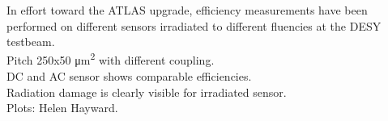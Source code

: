 \documentclass{beamer}
\begin{document}
\begin{frame}
\begin{columns}[t]
\tiny{
\vspace{10pt}
 In effort toward the ATLAS upgrade, efficiency measurements have been performed on different sensors irradiated to different fluencies at the DESY testbeam. \\ 
\vspace{10pt}
Pitch 250x50 \si{\micro\metre\squared} with different coupling.\\
\vspace{10pt}
DC and AC sensor shows comparable efficiencies.\\
\vspace{10pt}
Radiation damage is clearly visible for irradiated sensor.\\
\vspace{10pt}
Plots: Helen Hayward.
}
\end{columns}
\end{frame}
\end{document}
